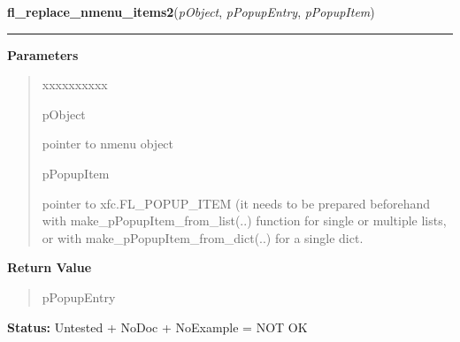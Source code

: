 \hspace{.8\funcindent}\begin{boxedminipage}{\funcwidth}

    \raggedright \textbf{fl\_replace\_nmenu\_items2}(\textit{pObject}, \textit{pPopupEntry}, \textit{pPopupItem})

    \vspace{-1.5ex}

    \rule{\textwidth}{0.5\fboxrule}
\setlength{\parskip}{2ex}
\setlength{\parskip}{1ex}
      \textbf{Parameters}
      \vspace{-1ex}

      \begin{quote}
        \begin{Ventry}{xxxxxxxxxx}

          \item[pObject]

          pointer to nmenu object

          \item[pPopupItem]

          pointer to xfc.FL\_POPUP\_ITEM (it needs to be prepared 
          beforehand with make\_pPopupItem\_from\_list(..) function for 
          single or multiple lists, or with 
          make\_pPopupItem\_from\_dict(..) for a single dict.

        \end{Ventry}

      \end{quote}

      \textbf{Return Value}
    \vspace{-1ex}

      \begin{quote}
      pPopupEntry

      \end{quote}

\textbf{Status:} Untested + NoDoc + NoExample = NOT OK



    \end{boxedminipage}

    \label{xformslib:library:fl_get_nmenu_popup}

    \vspace{0.5ex}

